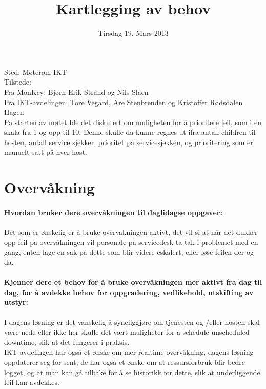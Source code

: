 


\title{Kartlegging av behov}
\date{Tirsdag 19. Mars 2013}


\maketitle
\noindent Sted: Møterom IKT \\
\noindent Tilstede: \\
\indent Fra MonKey: Bjørn-Erik Strand og Nils Slåen \\
\indent Fra IKT-avdelingen: Tore Vegard, Are Stenbrenden og Kristoffer Rødsdalen Hagen \\




\noindent På starten av møtet ble det diskutert om muligheten for å prioritere feil, som i en skala fra 1 og opp til 10. Denne skulle da kunne regnes ut ifra antall children til hosten, antall service sjekker, prioritet på servicesjekken, og prioritering som er manuelt satt på hver host.
\section{Overvåkning}
\paragraph{Hvordan bruker dere overvåkningen til daglidagse oppgaver:}
Det som er ønskelig er å bruke overvåkningen aktivt, det vil si at når det dukker opp feil på overvåkningen vil personale på servicedesk ta tak i problemet med en gang, enten lage en sak på dette som blir videre eskalert, eller løse feilen der og da.

\paragraph{Kjenner dere et behov for å bruke overvåkningen mer aktivt fra dag til dag, for å avdekke behov for oppgradering, vedlikehold, utskifting av utstyr:}
I dagens løsning er det vanskelig å syneliggjøre om tjenesten og /eller hosten skal være nede eller ikke her skulle det vært muligheter for å schedule unscheduled downtime, slik at det fungerer i praksis.\\

\noindent IKT-avdelingen har også et ønske om mer realtime overvåkning, dagens løsning oppdaterer seg for sent, de har også et ønske om at ressursforbruk blir bedre logget, og at man kan gå tilbake for å se historikk for dette, slik at underliggende feil kan avdekkes.
